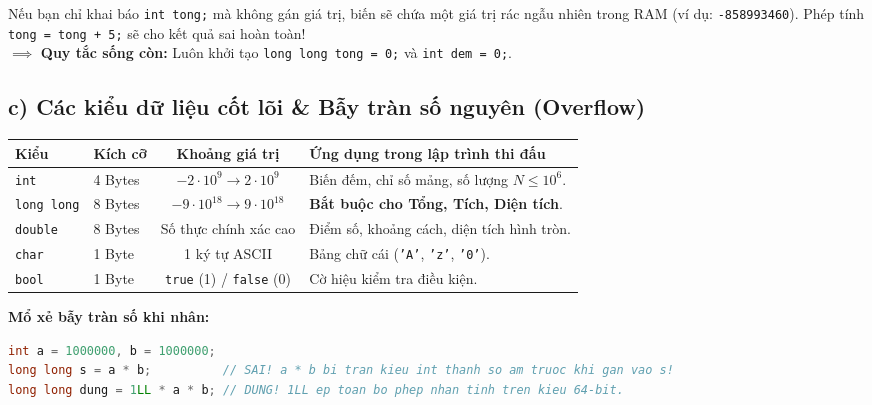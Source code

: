 \documentclass[11pt,a4paper]{article}
\begin{document}
\begin{tcolorbox}[colback=red!5!white,colframe=red!75!black,arc=1mm,title=\textbf{\footnotesize BẪY NGUY HIỂM: GIÁ TRỊ RÁC (UNINITIALIZED VARIABLE)}]
\footnotesize
Nếu bạn chỉ khai báo \texttt{int tong;} mà không gán giá trị, biến sẽ chứa một giá trị rác ngẫu nhiên trong RAM (ví dụ: \texttt{-858993460}). Phép tính \texttt{tong = tong + 5;} sẽ cho kết quả sai hoàn toàn!\\
$\implies$ \textbf{Quy tắc sống còn:} Luôn khởi tạo \texttt{long long tong = 0;} và \texttt{int dem = 0;}.
\end{tcolorbox}

\subsection*{\color{AsianBlue}\small c) Các kiểu dữ liệu cốt lõi \& Bẫy tràn số nguyên (Overflow)}
\begin{center}
\small
\begin{tabular}{@{}llcp{6.5cm}@{}}
\toprule
\textbf{Kiểu} & \textbf{Kích cỡ} & \textbf{Khoảng giá trị} & \textbf{Ứng dụng trong lập trình thi đấu} \\
\midrule
\texttt{int} & 4 Bytes & $-2 \cdot 10^9 \to 2 \cdot 10^9$ & Biến đếm, chỉ số mảng, số lượng $N \le 10^6$. \\
\texttt{long long} & 8 Bytes & $-9 \cdot 10^{18} \to 9 \cdot 10^{18}$ & \textbf{Bắt buộc cho Tổng, Tích, Diện tích}. \\
\texttt{double} & 8 Bytes & Số thực chính xác cao & Điểm số, khoảng cách, diện tích hình tròn. \\
\texttt{char} & 1 Byte & 1 ký tự ASCII & Bảng chữ cái (\texttt{'A'}, \texttt{'z'}, \texttt{'0'}). \\
\texttt{bool} & 1 Byte & \texttt{true} (1) / \texttt{false} (0) & Cờ hiệu kiểm tra điều kiện. \\
\bottomrule
\end{tabular}
\end{center}

\noindent
\textbf{Mổ xẻ bẫy tràn số khi nhân:}
\begin{lstlisting}[language=C++]
int a = 1000000, b = 1000000;
long long s = a * b;          // SAI! a * b bi tran kieu int thanh so am truoc khi gan vao s!
long long dung = 1LL * a * b; // DUNG! 1LL ep toan bo phep nhan tinh tren kieu 64-bit.
\end{lstlisting}
\end{document}
